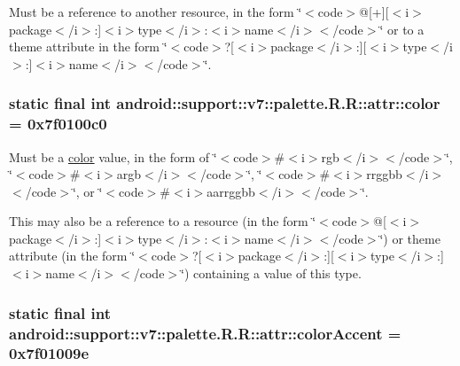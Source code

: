 Must be a reference to another resource, in the form \char`\"{}$<$code$>$@\mbox{[}+\mbox{]}\mbox{[}$<$i$>$package$<$/i$>$:\mbox{]}$<$i$>$type$<$/i$>$:$<$i$>$name$<$/i$>$$<$/code$>$\char`\"{} or to a theme attribute in the form \char`\"{}$<$code$>$?\mbox{[}$<$i$>$package$<$/i$>$:\mbox{]}\mbox{[}$<$i$>$type$<$/i$>$:\mbox{]}$<$i$>$name$<$/i$>$$<$/code$>$\char`\"{}. \hypertarget{classandroid_1_1support_1_1v7_1_1palette_1_1_r_1_1attr_b32c1c3b98b896568213e075d4fe6653}{
\subsubsection[{color}]{\setlength{\rightskip}{0pt plus 5cm}static final int android::support::v7::palette.R.R::attr::color = 0x7f0100c0}}
\label{classandroid_1_1support_1_1v7_1_1palette_1_1_r_1_1attr_b32c1c3b98b896568213e075d4fe6653}


Must be a \hyperlink{classandroid_1_1support_1_1v7_1_1palette_1_1_r_1_1color}{color} value, in the form of \char`\"{}$<$code$>$\#$<$i$>$rgb$<$/i$>$$<$/code$>$\char`\"{}, \char`\"{}$<$code$>$\#$<$i$>$argb$<$/i$>$$<$/code$>$\char`\"{}, \char`\"{}$<$code$>$\#$<$i$>$rrggbb$<$/i$>$$<$/code$>$\char`\"{}, or \char`\"{}$<$code$>$\#$<$i$>$aarrggbb$<$/i$>$$<$/code$>$\char`\"{}. 

This may also be a reference to a resource (in the form \char`\"{}$<$code$>$@\mbox{[}$<$i$>$package$<$/i$>$:\mbox{]}$<$i$>$type$<$/i$>$:$<$i$>$name$<$/i$>$$<$/code$>$\char`\"{}) or theme attribute (in the form \char`\"{}$<$code$>$?\mbox{[}$<$i$>$package$<$/i$>$:\mbox{]}\mbox{[}$<$i$>$type$<$/i$>$:\mbox{]}$<$i$>$name$<$/i$>$$<$/code$>$\char`\"{}) containing a value of this type. \hypertarget{classandroid_1_1support_1_1v7_1_1palette_1_1_r_1_1attr_8ba2b317471a08b044ace0d8015ab5fc}{
\subsubsection[{colorAccent}]{\setlength{\rightskip}{0pt plus 5cm}static final int android::support::v7::palette.R.R::attr::colorAccent = 0x7f01009e}}
\label{classandroid_1_1support_1_1v7_1_1palette_1_1_r_1_1attr_8ba2b317471a08b044ace0d8015ab5fc}


